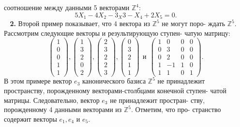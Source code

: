 \documentclass{mai_book}
\begin{document}
	соотношение между данными 5 векторами $\mathbb Z^4$:
	$$5X_1 - 4X_2 - 3_X3 - X_4 + 2X_5 = 0.$$
	${\ \ \ \ }${\bf 2.} Второй пример показывает, что 4 вектора из $\mathbb Z^5$ не могут поро-\linebreak
	ждать $\mathbb Z^5$. Рассмотрим следующие векторы и результирующую ступен-\linebreak
	чатую матрицу:
	$$\begin{pmatrix} 1 \\ 0 \\ 0 \\ 1 \\ 1 \end{pmatrix}, \begin{pmatrix} 1 \\ 3 \\ 2 \\ 0 \\ 2 \end{pmatrix}, \begin{pmatrix} 2 \\ 3 \\ 2 \\ 2 \\ 3 \end{pmatrix}, \begin{pmatrix} 0 \\ 3 \\ 2 \\ 1 \\ 1 \end{pmatrix} \ \ \text{и}\ \ \begin{pmatrix} 1 & 0 & 0 & 0 \\ 0 & 3 & 0 & 0 \\ 0 & 2 & 0 & 0 \\ 1 & -1 & 1 & 0 \\ 1 & 1 & 0 & 1 \end{pmatrix}.$$
	В этом примере вектор $e_3$ канонического базиса $\mathbb Z^5$ не принадлежит\linebreak
	пространству, порожденному векторами-столбцами конечной ступен-\linebreak
	чатой матрицы. Следовательно, вектор $e_3$ не принадлежит простран-\linebreak
	ству, порожденному 4 данными векторами из $\mathbb Z^5$. Отметим, что про-\linebreak
	странство содержит векторы $e_1, e_4$ и $e_5$.
	
	\pagebreak
	
	
\end{document}
